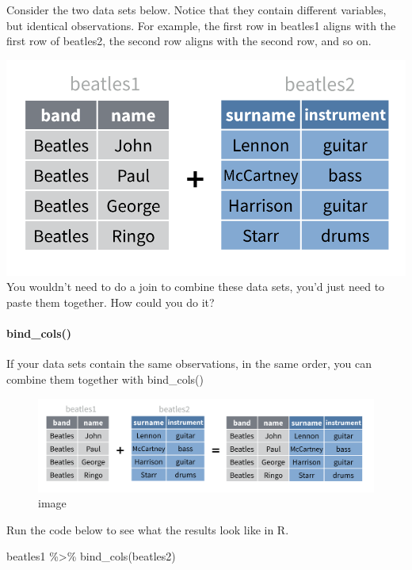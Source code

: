 \documentclass[
]{article}
\newenvironment{Shaded}{\begin{snugshade}}{\end{snugshade}}
\newcommand{\FunctionTok}[1]{\textcolor[rgb]{0.00,0.00,0.00}{#1}}
\newcommand{\NormalTok}[1]{#1}
\newcommand{\SpecialCharTok}[1]{\textcolor[rgb]{0.00,0.00,0.00}{#1}}
\begin{document}
Consider the two data sets below. Notice that they contain different
variables, but identical observations. For example, the first row in
beatles1 aligns with the first row of beatles2, the second row aligns
with the second row, and so on.

\includegraphics{data/beatles.png} You wouldn't need to do a join to
combine these data sets, you'd just need to paste them together. How
could you do it?

\hypertarget{bind_cols}{%
\paragraph{bind\_cols()}\label{bind_cols}}

If your data sets contain the same observations, in the same order, you
can combine them together with bind\_cols()

\begin{figure}
\centering
\includegraphics{data/bind-cols.png}
\caption{image}
\end{figure}

Run the code below to see what the results look like in R.

\begin{Shaded}
\begin{Highlighting}[]
\NormalTok{beatles1 }\SpecialCharTok{\%\textgreater{}\%} \FunctionTok{bind\_cols}\NormalTok{(beatles2)}
\end{Highlighting}
\end{Shaded}
\end{document}
